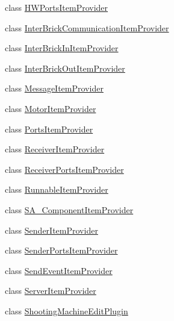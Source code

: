\begin{DoxyCompactItemize}
class \hyperlink{classshootingmachineemfmodel_1_1provider_1_1_h_w_ports_item_provider}{H\-W\-Ports\-Item\-Provider}
\item 
class \hyperlink{classshootingmachineemfmodel_1_1provider_1_1_inter_brick_communication_item_provider}{Inter\-Brick\-Communication\-Item\-Provider}
\item 
class \hyperlink{classshootingmachineemfmodel_1_1provider_1_1_inter_brick_in_item_provider}{Inter\-Brick\-In\-Item\-Provider}
\item 
class \hyperlink{classshootingmachineemfmodel_1_1provider_1_1_inter_brick_out_item_provider}{Inter\-Brick\-Out\-Item\-Provider}
\item 
class \hyperlink{classshootingmachineemfmodel_1_1provider_1_1_message_item_provider}{Message\-Item\-Provider}
\item 
class \hyperlink{classshootingmachineemfmodel_1_1provider_1_1_motor_item_provider}{Motor\-Item\-Provider}
\item 
class \hyperlink{classshootingmachineemfmodel_1_1provider_1_1_ports_item_provider}{Ports\-Item\-Provider}
\item 
class \hyperlink{classshootingmachineemfmodel_1_1provider_1_1_receiver_item_provider}{Receiver\-Item\-Provider}
\item 
class \hyperlink{classshootingmachineemfmodel_1_1provider_1_1_receiver_ports_item_provider}{Receiver\-Ports\-Item\-Provider}
\item 
class \hyperlink{classshootingmachineemfmodel_1_1provider_1_1_runnable_item_provider}{Runnable\-Item\-Provider}
\item 
class \hyperlink{classshootingmachineemfmodel_1_1provider_1_1_s_a___component_item_provider}{S\-A\-\_\-\-Component\-Item\-Provider}
\item 
class \hyperlink{classshootingmachineemfmodel_1_1provider_1_1_sender_item_provider}{Sender\-Item\-Provider}
\item 
class \hyperlink{classshootingmachineemfmodel_1_1provider_1_1_sender_ports_item_provider}{Sender\-Ports\-Item\-Provider}
\item 
class \hyperlink{classshootingmachineemfmodel_1_1provider_1_1_send_event_item_provider}{Send\-Event\-Item\-Provider}
\item 
class \hyperlink{classshootingmachineemfmodel_1_1provider_1_1_server_item_provider}{Server\-Item\-Provider}
\item 
class \hyperlink{classshootingmachineemfmodel_1_1provider_1_1_shooting_machine_edit_plugin}{Shooting\-Machine\-Edit\-Plugin}

\end{DoxyCompactItemize}
